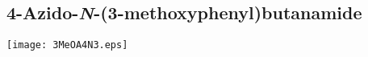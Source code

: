 
\subsection{4\hyp{}Azido\hyp{}\textit{N}\hyp{}(3\hyp{}methoxyphenyl)butanamide }


\begin{scheme}[H]
	\begin{center}
		\texttt{[image: 3MeOA4N3.eps]}
	\end{center}
\end{scheme}

